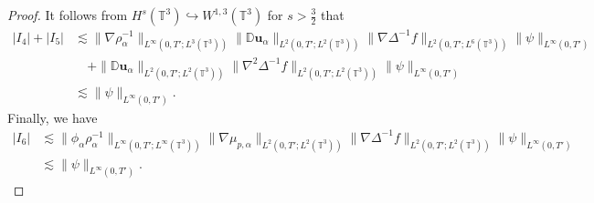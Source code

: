 \documentclass[reqno,a4paper,11pt]{amsart}
\theoremstyle{plain}
\numberwithin{equation}{section}
\begin{document}
\begin{proof}
						
						
						It follows from $H^{s}(\mathbb{T}^{3})\hookrightarrow W^{1,3}(\mathbb{T}^{3})$  for $s>\frac{3}{2}$ that
						\begin{align}
							\label{lem55-8}
							\nonumber  |I_{4}|+|I_{5}|& \lesssim\|\nabla\rho_{\alpha}^{-1}\|_{L^{\infty}(0,T';L^{3}(\mathbb{T}^{3}))}\|\mathbb{ D}\mathbf{u}_{\alpha}\|_{L^{2}(0,T';L^{2}(\mathbb{T}^{3}))}\|\nabla\Delta^{-1}f\|_{L^{2}(0,T';L^{6}(\mathbb{T}^{3}))}\|\psi\|_{L^{\infty}(0,T')}
							\\&\nonumber \quad +\|\mathbb{ D}\mathbf{u}_{\alpha}\|_{L^{2}(0,T';L^{2}(\mathbb{T}^{3}))}\|\nabla^{2}\Delta^{-1}f\|_{L^{2}(0,T';L^{2}(\mathbb{T}^{3}))}\|\psi\|_{L^{\infty}(0,T')}
							\\&\lesssim \|\psi\|_{L^{\infty}(0,T')}.
						\end{align}
						Finally, we have
						\begin{align}\label{lem55-10}
							\nonumber|I_{6}| &\lesssim \|\phi_{\alpha}\rho_{\alpha}^{-1} \|_{L^{\infty}(0,T';L^{\infty}(\mathbb{T}^{3}))}\|\nabla \mu_{p,\alpha}\|_{L^{2}(0,T';L^{2}(\mathbb{T}^{3}))}\|\nabla\Delta^{-1}f\|_{L^{2}(0,T';L^{2}(\mathbb{T}^{3}))}\|\psi\|_{L^{\infty}(0,T')}
							\\&\lesssim \|\psi\|_{L^{\infty}(0,T')}.
						\end{align}
						

\end{proof}
\end{document}
